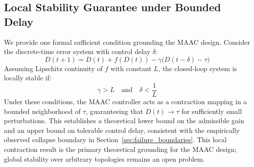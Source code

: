 \documentclass{article}
\begin{document}
\subsection*{Local Stability Guarantee under Bounded Delay}
We provide one formal sufficient condition grounding the MAAC design. Consider the discrete-time error system with control delay $\delta$:
\begin{equation}
    D(t+1) = D(t) + f(D(t)) - \gamma\bigl(D(t-\delta) - \tau\bigr)
\end{equation}
Assuming Lipschitz continuity of $f$ with constant $L$, the closed-loop system is locally stable if:
\begin{equation}
    \gamma > L \quad \text{and} \quad \delta < \frac{1}{L}
\end{equation}
Under these conditions, the MAAC controller acts as a contraction mapping in a bounded neighborhood of $\tau$, guaranteeing that $D(t) \to \tau$ for sufficiently small perturbations. This establishes a theoretical lower bound on the admissible gain and an upper bound on tolerable control delay, consistent with the empirically observed collapse boundary in Section~\ref{sec:failure_boundaries}. This local contraction result is the primary theoretical grounding for the MAAC design; global stability over arbitrary topologies remains an open problem.

\newpage
\end{document}
